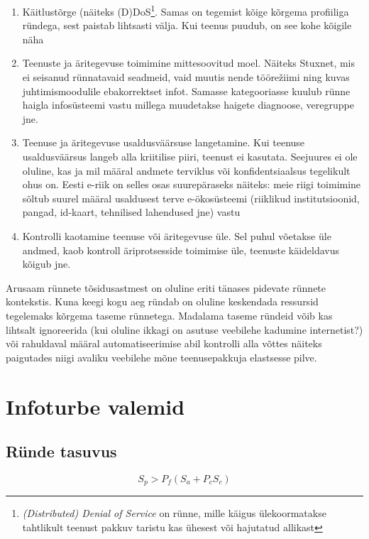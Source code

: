 \begin{enumerate}
	\item Käitlustõrge (näiteks (D)DoS\footnote{\emph{(Distributed) Denial of Service} on rünne, mille käigus ülekoormatakse tahtlikult teenust pakkuv taristu kas ühesest või hajutatud allikast}. Samas on tegemist kõige kõrgema profiiliga ründega, sest paistab lihtsasti välja. Kui teenus puudub, on see kohe kõigile näha
	\item Teenuste ja äritegevuse toimimine mittesoovitud moel. Näiteks Stuxnet, mis ei seisanud rünnatavaid seadmeid, vaid muutis nende tööre\v{z}iimi ning kuvas juhtimismoodulile ebakorrektset infot. Samasse kategooriasse kuulub rünne haigla infosüsteemi vastu millega muudetakse haigete diagnoose, veregruppe jne. 
	\item Teenuse ja äritegevuse usaldusväärsuse langetamine. Kui teenuse usaldusväärsus langeb alla kriitilise piiri, teenust ei kasutata. Seejuures ei ole oluline, kas ja mil määral andmete terviklus või konfidentsiaalsus tegelikult ohus on. Eesti e-riik on selles osas suurepäraseks näiteks: meie riigi toimimine sõltub suurel määral usaldusest terve e-ökosüsteemi (riiklikud institutsioonid, pangad, id-kaart, tehnilised lahendused jne) vastu 
	\item Kontrolli kaotamine teenuse või äritegevuse üle. Sel puhul võetakse üle andmed, kaob kontroll äriprotsesside toimimise üle, teenuste käideldavus kõigub jne.
\end{enumerate}

Arusaam rünnete tõsidusastmest on oluline eriti tänases pidevate rünnete kontekstis. Kuna keegi kogu aeg ründab on oluline keskendada ressursid tegelemaks kõrgema taseme rünnetega. Madalama taseme ründeid võib kas lihtsalt ignoreerida (kui oluline ikkagi on asutuse veebilehe kadumine internetist?) või rahuldaval määral automatiseerimise abil kontrolli alla võttes näiteks paigutades niigi avaliku veebilehe mõne teenusepakkuja elastsesse pilve.

\section{Infoturbe valemid} 
\label{sec:valemid}
\subsection{Ründe tasuvus}
\begin{equation}
		S_p>P_f(S_a + P_c S_c)
		\label{eq:tasuvus}
\end{equation}


